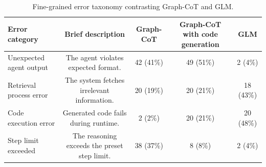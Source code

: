 
\begin{table}[h]
\centering
\caption{Fine-grained error taxonomy contrasting Graph-CoT and GLM.}
\small
\begin{tabular}{lcccc}
\toprule
\textbf{Error category} & \textbf{Brief description} & \textbf{Graph-CoT} & \textbf{Graph-CoT with code generation} & \textbf{GLM} \\
\midrule
Unexpected agent output & The agent violates expected format. & 42 (41\%) & 49 (51\%) & 2 (4\%) \\
\midrule
Retrieval process error & The system fetches irrelevant information. & 20 (19\%) & 20 (21\%) & 18 (43\%) \\
\midrule
Code execution error & Generated code fails during runtime. & 2 (2\%) & 20 (21\%) & 20 (48\%) \\
\midrule
Step limit exceeded & The reasoning exceeds the preset step limit. & 38 (37\%) & 8 (8\%) & 2 (4\%) \\
\bottomrule
\end{tabular}
\label{tab:error-comparison}
\end{table}
